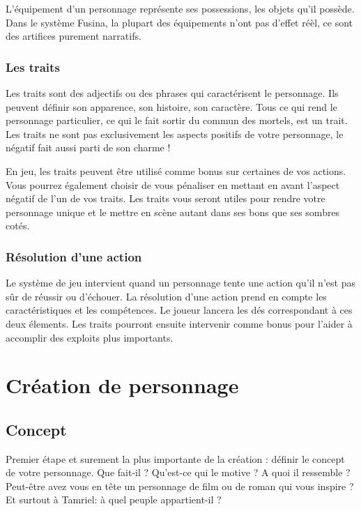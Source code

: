 L'équipement d'un personnage représente ses possessions, les objets qu'il possède. Dans le système Fusina, la plupart des équipements n'ont pas d'effet réèl, ce sont des artifices purement narratifs. 

\subsection{Les traits}

Les traits sont des adjectifs ou des phrases qui caractérisent le personnage. Ils peuvent définir son apparence, son histoire, son caractère. Tous ce qui rend le personnage particulier, ce qui le fait sortir du commun des mortels, est un trait. Les traits ne sont pas exclusivement les aspects positifs de votre personnage, le négatif fait aussi parti de son charme !

En jeu, les traits peuvent être utilisé comme bonus sur certaines de vos actions. Vous pourrez également choisir de vous pénaliser en mettant en avant l'aspect négatif de l'un de vos traits. Les traits vous seront utiles pour rendre votre personnage unique et le mettre en scène autant dans ses bons que ses sombres cotés.

\subsection{Résolution d'une action}

Le système de jeu intervient quand un personnage tente une action qu'il n'est pas sûr de réussir ou d'échouer. La résolution d'une action prend en compte les caractéristiques et les compétences. Le joueur lancera les dés correspondant à ces deux élements. Les traits pourront ensuite intervenir comme bonus pour l'aider à accomplir des exploits plus importants.


\chapter{Création de personnage}

\section{Concept}

Premier étape et surement la plus importante de la création : définir le concept de votre personnage. Que fait-il ? Qu'est-ce qui le motive ? A quoi il ressemble ? Peut-être avez vous en tête un personnage de film ou de roman qui vous inspire ? Et surtout à Tamriel: à quel peuple appartient-il ?

